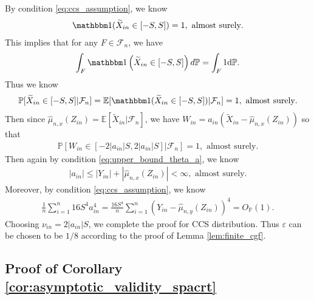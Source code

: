 \documentclass[12pt]{article}
\theoremstyle{definition}
\def\P{\mathbb{P}}
\def\P{\mathbb{P}}
\newcommand{\E}{\mathbb E}								%
\renewcommand{\P}{\mathbb{P}}							%
\newcommand{\indicator}{\mathbbm 1}						%
\newcommand{\srz}{Z}									%
\newcommand{\srxk}{\widetilde X}						%
\newcommand{\sry}{Y}									%
\begin{document}
By condition \eqref{eq:ccs_assumption}, we know 
\begin{align*}
  \indicator(\widetilde{X}_{in}\in [-S,S])=1,\text{ almost surely}.
\end{align*}
This implies that for any $F\in\mathcal{F}_n$, we have 
\begin{align*}
  \int_F \indicator\left(\widetilde{X}_{in}\in [-S,S]\right)d\mathbb{P}=\int_F 1 \mathrm{d}\mathbb P.
\end{align*}
Thus we know 
\begin{align*}
  \P[\widetilde{X}_{in}\in [-S,S]|\mathcal{F}_n]=\E[\indicator(\widetilde{X}_{in}\in [-S,S])|\mathcal{F}_n]=1,\text{ almost surely}.
\end{align*}
Then since $\widehat{\mu}_{n,x}(\srz_{in})=\E[\srxk_{in}|\mathcal{F}_n]$, we have $W_{in}=a_{in}(\srxk_{in}-\widehat{\mu}_{n,x}(\srz_{in}))$ so that
\begin{align*}
  \P\left[W_{in}\in [-2|a_{in}|S,2|a_{in}|S]|\mathcal{F}_n\right]=1,\text{ almost surely}.
\end{align*}
Then again by condition \eqref{eq:upper_bound_theta_a}, we know 
\begin{align*}
  |a_{in}|\leq |\sry_{in}|+|\widehat{\mu}_{n,x}(\srz_{in})|<\infty,\text{ almost surely}.
\end{align*}
Moreover, by condition \eqref{eq:ccs_assumption}, we know 
\begin{align*}
  \frac{1}{n}\sum_{i=1}^n 16S^4a_{in}^4=\frac{16S^4}{n}\sum_{i=1}^n (\sry_{in}-\widehat{\mu}_{n,y}(\srz_{in}))^4=O_{\P}(1).
\end{align*}
Choosing $\nu_{in}=2|a_{in}|S$, we complete the proof for CCS distribution. Thus $\varepsilon$ can be chosen to be $1/8$ according to the proof of Lemma \ref{lem:finite_cgf}.


\subsection{Proof of Corollary \ref{cor:asymptotic_validity_spacrt}}
\end{document}
